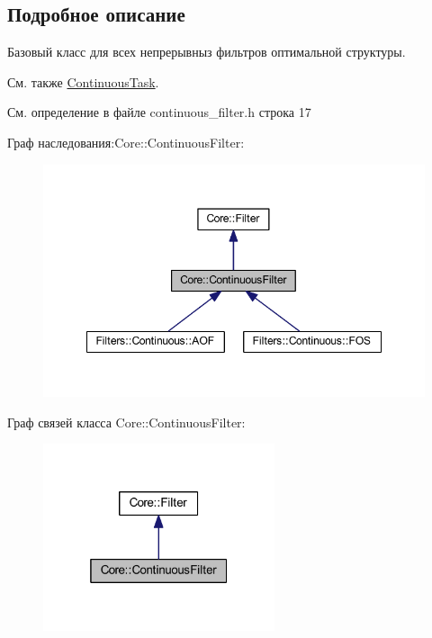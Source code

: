 \subsection{Подробное описание}
Базовый класс для всех непрерывныз фильтров оптимальной структуры. 

\begin{DoxySeeAlso}{См. также}
\hyperlink{class_core_1_1_continuous_task}{Continuous\+Task}. 
\end{DoxySeeAlso}


См. определение в файле continuous\+\_\+filter.\+h строка 17



Граф наследования\+:Core\+:\+:Continuous\+Filter\+:\nopagebreak
\begin{figure}[H]
\begin{center}
\leavevmode
\includegraphics[width=348pt]{class_core_1_1_continuous_filter__inherit__graph}
\end{center}
\end{figure}


Граф связей класса Core\+:\+:Continuous\+Filter\+:\nopagebreak
\begin{figure}[H]
\begin{center}
\leavevmode
\includegraphics[width=193pt]{class_core_1_1_continuous_filter__coll__graph}
\end{center}
\end{figure}



